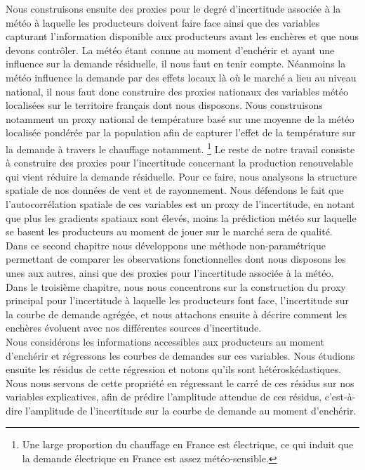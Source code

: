 Nous construisons ensuite des proxies pour le degré d'incertitude associée à la météo à laquelle les producteurs doivent faire face ainsi que des variables capturant l'information disponible aux producteurs avant les enchères et que nous devons contrôler. La météo étant connue au moment d'enchérir et ayant une influence sur la demande résiduelle, il nous faut en tenir compte. Néanmoins la météo influence la demande par des effets locaux là où le marché a lieu au niveau national, il nous faut donc construire des proxies nationaux des variables météo localisées sur le territoire français dont nous disposons. Nous construisons notamment un proxy national de température basé sur une moyenne de la météo localisée pondérée par la population afin de capturer l'effet de la température sur la demande à travers le chauffage notamment. \footnote{Une large proportion du chauffage en France est électrique, ce qui induit que la demande électrique en France est assez météo-sensible.} Le reste de notre travail consiste à construire des proxies pour l'incertitude concernant la production renouvelable qui vient réduire la demande résiduelle. Pour ce faire, nous analysons la structure spatiale de nos données de vent et de rayonnement. Nous défendons le fait que l'autocorrélation spatiale de ces variables est un proxy de l'incertitude, en notant que plus les gradients spatiaux sont élevés, moins la prédiction météo sur laquelle se basent les producteurs au moment de jouer sur le marché sera de qualité.\\

Dans ce second chapitre nous développons une méthode non-paramétrique permettant de comparer les observations fonctionnelles dont nous disposons les unes aux autres, ainsi que des proxies pour l'incertitude associée à la météo.\\

Dans le troisième chapitre, nous nous concentrons sur la construction du proxy principal pour l'incertitude à laquelle les producteurs font face, l'incertitude sur la courbe de demande agrégée, et nous attachons ensuite à décrire comment les enchères évoluent avec nos différentes sources d'incertitude.\\

Nous considérons les informations accessibles aux producteurs au moment d'enchérir et régressons les courbes de demandes sur ces variables. Nous étudions ensuite les résidus de cette régression et notons qu'ils sont hétéroskédastiques. Nous nous servons de cette propriété en régressant le carré de ces résidus sur nos variables explicatives, afin de prédire l'amplitude attendue de ces résidus, c'est-à-dire l'amplitude de l'incertitude sur la courbe de demande au moment d'enchérir.\\

